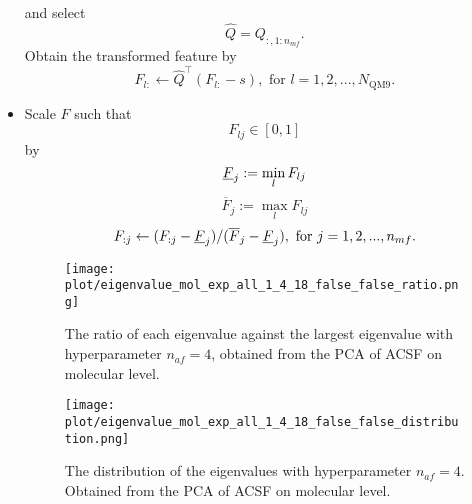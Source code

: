 \documentclass[12pt]{article}
\begin{document}
\begin{itemize}
\begin{equation}
		\end{equation}
		and select
		\begin{equation}
			\hat{Q} = Q_{:, 1:n_{mf}}.
		\end{equation}
		Obtain the transformed feature by
		\begin{equation}
			\label{eq:pca_mol_end}
			F_{l:} \leftarrow \hat{Q}^\top(F_{l:} - s), \text{ for }l = 1,2,...,N_\text{QM9}.
		\end{equation}
	\item Scale $F$ such that 
	\begin{equation}
		\label{eq:scale_mol_1}
		F_{lj} \in [0, 1]
	\end{equation}
	by
	\begin{equation}
		\label{eq:scale_mol_2}
		\underbar{$F$}_{j} := \min_{l} F_{lj}
	\end{equation}
	\begin{equation}
		\overline{F}_{j} := \max_{l} F_{lj}
	\end{equation}
	\begin{equation}
		F_{:j} \leftarrow (F_{:j} - \underbar{$F$}_{j})/ (\overline{F}_{j} - \underbar{$F$}_{j}), \text{ for } j = 1,2,..., n_{mf}.
		\label{eq:molminmax}
	\end{equation}
	\begin{figure}[h]
		\label{fig:PCA_mol_rat}
		\centering
		\texttt{[image: plot/eigenvalue\_mol\_exp\_all\_1\_4\_18\_false\_false\_ratio.png]}
		\caption{The ratio of each eigenvalue against the largest eigenvalue with hyperparameter $n_{af} = 4$, obtained from the PCA of ACSF on molecular level.}
	\end{figure}
	\begin{figure}[H]
		\label{fig:PCA_mol_dist}
		\centering
		\texttt{[image: plot/eigenvalue\_mol\_exp\_all\_1\_4\_18\_false\_false\_distribution.png]}
		\caption{The distribution of the eigenvalues with hyperparameter $n_{af} = 4$. Obtained from the PCA of ACSF on molecular level.}
	\end{figure}
\end{itemize}
\end{document}
